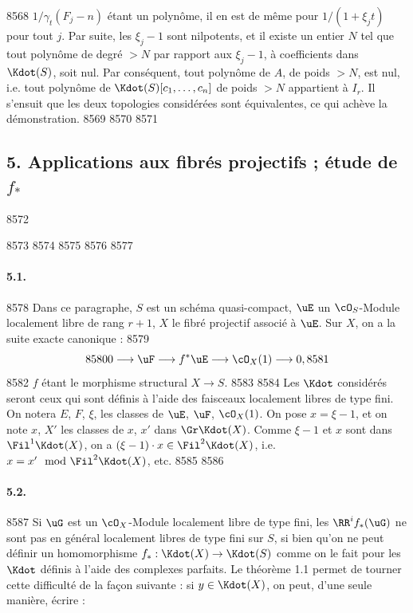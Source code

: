  8568	$1/\gamma_t(F_j - n)$ \'etant un polyn\^ome, il en est de m\^eme pour $1/(1 + \xi_j t)$ pour tout $j$. Par suite, les $\xi_j - 1$ sont nilpotents, et il existe un entier $N$ tel que tout polyn\^ome de degr\'e $> N$ par rapport aux $\xi_j - 1$, \`a coefficients dans $\Kdot(S)$, soit nul. Par cons\'equent, tout polyn\^ome de $A$, de poids $> N$, est nul, i.e. tout polyn\^ome de $\Kdot(S)[c_1,\dots,c_n]$ de poids $> N$ appartient \`a $I_r$. Il s'ensuit que les deux topologies consid\'er\'ees sont \'equivalentes, ce qui ach\`eve la d\'emonstration.
  8569	
  8570	%
  8571	\subsection*{5. Applications aux fibr\'es projectifs ; \'etude de $f_{*}$}
  8572	
  8573	
  8574	\setcounter{section}{5}
  8575	\setcounter{subsection}{0}
  8576	
  8577	\paragraph{5.1.}
  8578	Dans ce paragraphe, $S$ est un sch\'ema quasi-compact, $\uE$ un $\cO_S$-Module localement libre de rang $r+1$, $X$ le fibr\'e projectif associ\'e \`a $\uE$. Sur $X$, on a la suite exacte canonique :
  8579	\[
  8580	0 \longrightarrow \uF \longrightarrow f^{*}\uE \longrightarrow \cO_X(1) \longrightarrow 0,
  8581	\]
  8582	$f$ \'etant le morphisme structural $X \to S$.
  8583	
  8584	Les $\Kdot$ consid\'er\'es seront ceux qui sont d\'efinis \`a l'aide des faisceaux localement libres de type fini. On notera $E$, $F$, $\xi$, les classes de $\uE$, $\uF$, $\cO_X(1)$. On pose $x = \xi - 1$, et on note $x$, $X'$ les classes de $x$, $x'$ dans $\Gr \Kdot(X)$. Comme $\xi - 1$ et $x$ sont dans $\Fil^1\Kdot(X)$, on a $(\xi - 1) \cdot x \in \Fil^2\Kdot(X)$, i.e. $x = x' \mod \Fil^2\Kdot(X)$, etc.
  8585	
  8586	\paragraph{5.2.}
  8587	Si $\uG$ est un $\cO_X$-Module localement libre de type fini, les $\RR^i f_{*}(\uG)$ ne sont pas en g\'en\'eral localement libres de type fini sur $S$, si bien qu'on ne peut d\'efinir un homomorphisme $f_{*}: \Kdot(X) \to \Kdot(S)$ comme on le fait pour les $\Kdot$ d\'efinis \`a l'aide des complexes parfaits. Le th\'eor\`eme 1.1 permet de tourner cette difficult\'e de la fa\c{c}on suivante : si $y \in \Kdot(X)$, on peut, d'une seule mani\`ere, \'ecrire :
